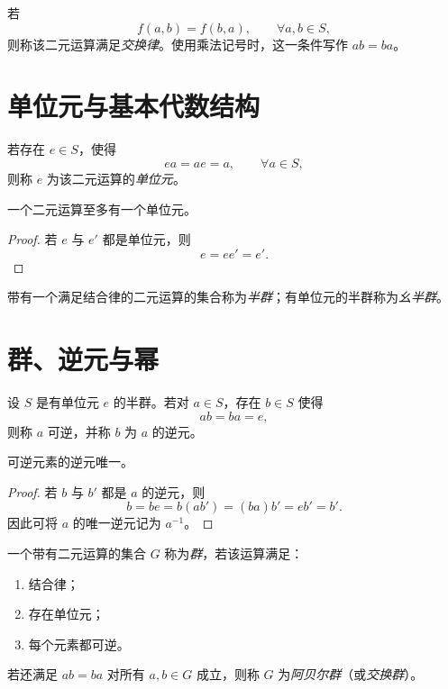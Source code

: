 \begin{definition}[交换律]
若
\[
  f(a,b)=f(b,a),\qquad \forall a,b\in S,
\]
则称该二元运算满足\emph{交换律}。使用乘法记号时，这一条件写作 $ab=ba$。
\end{definition}

\section{单位元与基本代数结构}

\begin{definition}[单位元]
若存在 $e\in S$，使得
\[
  ea=ae=a,\qquad \forall a\in S,
\]
则称 $e$ 为该二元运算的\emph{单位元}。
\end{definition}

\begin{proposition}
一个二元运算至多有一个单位元。
\end{proposition}

\begin{proof}
若 $e$ 与 $e'$ 都是单位元，则
\[
  e=ee'=e'.
\]
\end{proof}

\begin{definition}[半群与幺半群]
带有一个满足结合律的二元运算的集合称为\emph{半群}；有单位元的半群称为\emph{幺半群}。
\end{definition}

\section{群、逆元与幂}

\begin{definition}[逆元]
设 $S$ 是有单位元 $e$ 的半群。若对 $a\in S$，存在 $b\in S$ 使得
\[
  ab=ba=e,
\]
则称 $a$ 可逆，并称 $b$ 为 $a$ 的逆元。
\end{definition}

\begin{proposition}
可逆元素的逆元唯一。
\end{proposition}

\begin{proof}
若 $b$ 与 $b'$ 都是 $a$ 的逆元，则
\[
  b=be=b(ab')=(ba)b'=eb'=b'.
\]
因此可将 $a$ 的唯一逆元记为 $a^{-1}$。
\end{proof}

\begin{definition}[群]
一个带有二元运算的集合 $G$ 称为\emph{群}，若该运算满足：
\begin{enumerate}
  \item 结合律；
  \item 存在单位元；
  \item 每个元素都可逆。
\end{enumerate}
若还满足 $ab=ba$ 对所有 $a,b\in G$ 成立，则称 $G$ 为\emph{阿贝尔群}（或\emph{交换群}）。
\end{definition}

